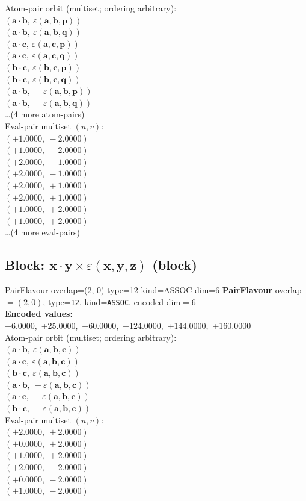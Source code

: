 \documentclass[a4paper,11pt]{article}
\newcommand{\pdcegfomjfhook}[2]{\mathbf{#1} \cdot \mathbf{#2}}
\newcommand{\kblbmcpggoncpf}[3]{\varepsilon(\mathbf{#1},\mathbf{#2},\mathbf{#3})}
\begin{document}
\quad Atom-pair orbit (multiset; ordering arbitrary):\\
$(\pdcegfomjfhook{a}{b},\ \kblbmcpggoncpf{a}{b}{p})$\\
$(\pdcegfomjfhook{a}{b},\ \kblbmcpggoncpf{a}{b}{q})$\\
$(\pdcegfomjfhook{a}{c},\ \kblbmcpggoncpf{a}{c}{p})$\\
$(\pdcegfomjfhook{a}{c},\ \kblbmcpggoncpf{a}{c}{q})$\\
$(\pdcegfomjfhook{b}{c},\ \kblbmcpggoncpf{b}{c}{p})$\\
$(\pdcegfomjfhook{b}{c},\ \kblbmcpggoncpf{b}{c}{q})$\\
$(\pdcegfomjfhook{a}{b},\ -\kblbmcpggoncpf{a}{b}{p})$\\
$(\pdcegfomjfhook{a}{b},\ -\kblbmcpggoncpf{a}{b}{q})$\\
\quad \ldots (4 more atom-pairs)\\
\quad Eval-pair multiset $(u, v)$:\\
$(+1.0000,\ -2.0000)$\\
$(+1.0000,\ -2.0000)$\\
$(+2.0000,\ -1.0000)$\\
$(+2.0000,\ -1.0000)$\\
$(+2.0000,\ +1.0000)$\\
$(+2.0000,\ +1.0000)$\\
$(+1.0000,\ +2.0000)$\\
$(+1.0000,\ +2.0000)$\\
\quad \ldots (4 more eval-pairs)\\

\subsection{Block: $\pdcegfomjfhook{x}{y} \times \kblbmcpggoncpf{x}{y}{z}$  (block)}
    PairFlavour  overlap=(2, 0)  type=12  kind=ASSOC  dim=6
\textbf{PairFlavour} overlap$=(2, 0)$, type=\texttt{12}, kind=\texttt{ASSOC}, encoded dim$=6$\\
\textbf{      Encoded values}: +6.0000,\ +25.0000,\ +60.0000,\ +124.0000,\ +144.0000,\ +160.0000\\
\quad Atom-pair orbit (multiset; ordering arbitrary):\\
$(\pdcegfomjfhook{a}{b},\ \kblbmcpggoncpf{a}{b}{c})$\\
$(\pdcegfomjfhook{a}{c},\ \kblbmcpggoncpf{a}{b}{c})$\\
$(\pdcegfomjfhook{b}{c},\ \kblbmcpggoncpf{a}{b}{c})$\\
$(\pdcegfomjfhook{a}{b},\ -\kblbmcpggoncpf{a}{b}{c})$\\
$(\pdcegfomjfhook{a}{c},\ -\kblbmcpggoncpf{a}{b}{c})$\\
$(\pdcegfomjfhook{b}{c},\ -\kblbmcpggoncpf{a}{b}{c})$\\
\quad Eval-pair multiset $(u, v)$:\\
$(+2.0000,\ +2.0000)$\\
$(+0.0000,\ +2.0000)$\\
$(+1.0000,\ +2.0000)$\\
$(+2.0000,\ -2.0000)$\\
$(+0.0000,\ -2.0000)$\\
$(+1.0000,\ -2.0000)$\\
\end{document}
